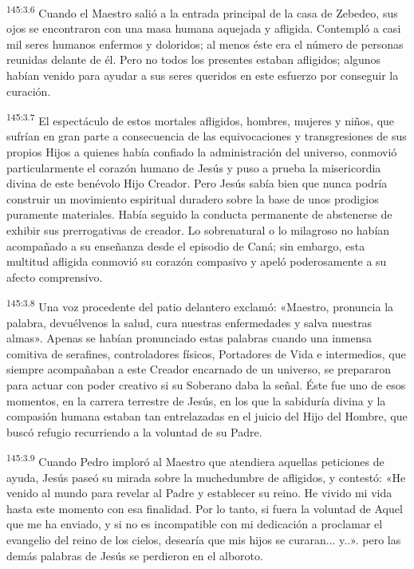 \par 
\textsuperscript{145:3.6} Cuando el Maestro salió a la entrada principal de la casa de Zebedeo, sus ojos se encontraron con una masa humana aquejada y afligida. Contempló a casi mil seres humanos enfermos y doloridos; al menos éste era el número de personas reunidas delante de él. Pero no todos los presentes estaban afligidos; algunos habían venido para ayudar a sus seres queridos en este esfuerzo por conseguir la curación.

\par 
\textsuperscript{145:3.7} El espectáculo de estos mortales afligidos, hombres, mujeres y niños, que sufrían en gran parte a consecuencia de las equivocaciones y transgresiones de sus propios Hijos a quienes había confiado la administración del universo, conmovió particularmente el corazón humano de Jesús y puso a prueba la misericordia divina de este benévolo Hijo Creador. Pero Jesús sabía bien que nunca podría construir un movimiento espiritual duradero sobre la base de unos prodigios puramente materiales. Había seguido la conducta permanente de abstenerse de exhibir sus prerrogativas de creador. Lo sobrenatural o lo milagroso no habían acompañado a su enseñanza desde el episodio de Caná; sin embargo, esta multitud afligida conmovió su corazón compasivo y apeló poderosamente a su afecto comprensivo.

\par 
\textsuperscript{145:3.8} Una voz procedente del patio delantero exclamó: «Maestro, pronuncia la palabra, devuélvenos la salud, cura nuestras enfermedades y salva nuestras almas». Apenas se habían pronunciado estas palabras cuando una inmensa comitiva de serafines, controladores físicos, Portadores de Vida e intermedios, que siempre acompañaban a este Creador encarnado de un universo, se prepararon para actuar con poder creativo si su Soberano daba la señal. Éste fue uno de esos momentos, en la carrera terrestre de Jesús, en los que la sabiduría divina y la compasión humana estaban tan entrelazadas en el juicio del Hijo del Hombre, que buscó refugio recurriendo a la voluntad de su Padre.

\par 
\textsuperscript{145:3.9} Cuando Pedro imploró al Maestro que atendiera aquellas peticiones de ayuda, Jesús paseó su mirada sobre la muchedumbre de afligidos, y contestó: «He venido al mundo para revelar al Padre y establecer su reino. He vivido mi vida hasta este momento con esa finalidad. Por lo tanto, si fuera la voluntad de Aquel que me ha enviado, y si no es incompatible con mi dedicación a proclamar el evangelio del reino de los cielos, desearía que mis hijos se curaran... y..». pero las demás palabras de Jesús se perdieron en el alboroto.

